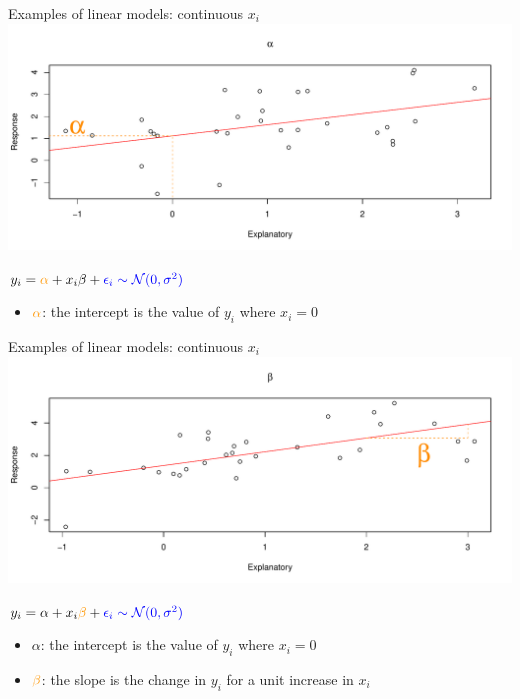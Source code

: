 \documentclass[
  ignorenonframetext,
]{beamer}
\providecommand{\tightlist}{%
  \setlength{\itemsep}{0pt}\setlength{\parskip}{0pt}}
\begin{document}
\begin{frame}{Examples of linear models: continuous \(x_i\)}
\label{examples-of-linear-models-continuous-x_i}
\includegraphics{IntroLM_files/figure-beamer/reg-1.pdf}

\(y_i = \textcolor{darkorange}{\alpha} + x_i\beta + \textcolor{blue}{\epsilon_i\sim \mathcal{N}(0,\sigma^2)}\)

\begin{itemize}
\tightlist
\item
  \(\textcolor{darkorange}{\alpha}\): the intercept is the value of
  \(y_i\) where \(x_i = 0\)
\end{itemize}
\end{frame}

\begin{frame}{Examples of linear models: continuous \(x_i\)}
\label{examples-of-linear-models-continuous-x_i-1}
\includegraphics{IntroLM_files/figure-beamer/reg2-1.pdf}

\(y_i = \alpha + x_i\textcolor{darkorange}{\beta} + \textcolor{blue}{\epsilon_i\sim \mathcal{N}(0,\sigma^2)}\)

\begin{itemize}
\tightlist
\item
  \(\alpha\): the intercept is the value of \(y_i\) where \(x_i = 0\)
\item
  \(\textcolor{darkorange}{\beta}\): the slope is the change in \(y_i\)
  for a unit increase in \(x_i\)
\end{itemize}
\end{frame}
\end{document}
